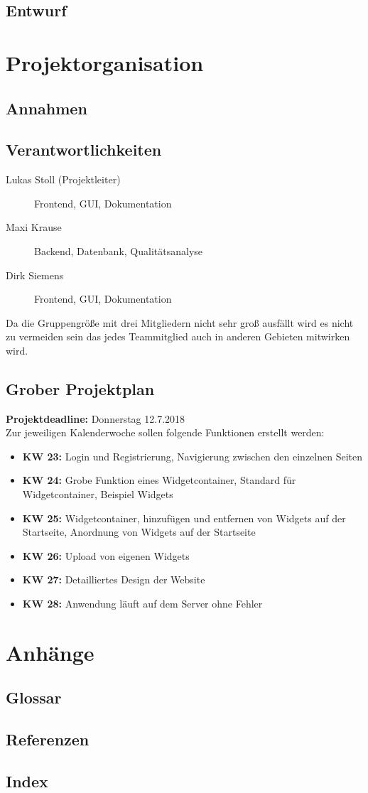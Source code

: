 	\subsection{Entwurf}
	

\section{Projektorganisation}

	\subsection{Annahmen}
	
	\subsection{Verantwortlichkeiten}
		\begin{description}
			\item[Lukas Stoll (Projektleiter)] Frontend, GUI, Dokumentation
			\item[Maxi Krause] Backend, Datenbank, Qualitätsanalyse
			\item[Dirk Siemens] Frontend, GUI, Dokumentation
		\end{description}
		Da die Gruppengröße mit drei Mitgliedern nicht sehr groß ausfällt wird es nicht zu vermeiden sein das jedes Teammitglied auch in anderen Gebieten mitwirken wird. 
	
	\subsection{Grober Projektplan}
		\textbf{Projektdeadline: } Donnerstag 12.7.2018 \\
		Zur jeweiligen Kalenderwoche sollen folgende Funktionen erstellt werden: 
		\begin{itemize}
			\item \textbf{KW 23: }Login und Registrierung, Navigierung zwischen den einzelnen Seiten 
			\item \textbf{KW 24: }Grobe Funktion eines Widgetcontainer, Standard für Widgetcontainer, Beispiel Widgets  
			\item \textbf{KW 25: }Widgetcontainer, hinzufügen und entfernen von Widgets auf der Startseite, Anordnung von Widgets auf der Startseite   
			\item \textbf{KW 26: }Upload von eigenen Widgets
			\item \textbf{KW 27: }Detailliertes Design der Website 
			\item \textbf{KW 28: }Anwendung läuft auf dem Server ohne Fehler
		\end{itemize}
		
		
	

\section{Anhänge}

	\subsection{Glossar}
	
	\subsection{Referenzen}
	
	\subsection{Index}